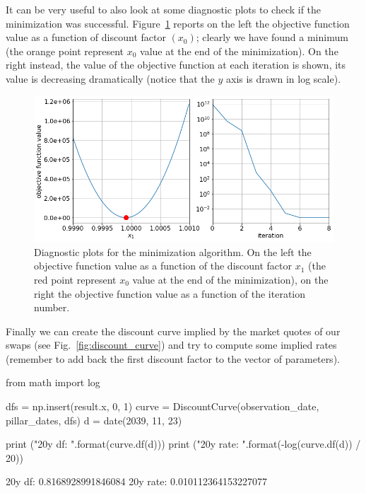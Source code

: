 It can be very useful to also look at some diagnostic plots to check if the minimization was successful. Figure~\ref{fig:minimization_diagnostic} reports on the left the objective function value as a function of discount factor $(x_0)$; clearly we have found a minimum (the orange point represent $x_0$ value at the end of the minimization). On the right instead, the value of the objective function at each iteration is shown, its value is decreasing dramatically (notice that the $y$ axis is drawn in log scale).

\begin{figure}[htb]
	\centering
	\includegraphics[width=0.9\linewidth]{figures/obj_func_diagnostic}
	\caption{Diagnostic plots for the minimization algorithm. On the left the objective function value as a function of the discount factor $x_1$ (the red point represent $x_0$ value at the end of the minimization), on the right the objective function value as a function of the iteration number.}
	\label{fig:minimization_diagnostic}
\end{figure}

Finally we can create the discount curve implied by the market quotes of our swaps (see Fig.~\ref{fig:discount_curve}) and try to compute some implied rates (remember to add back the first discount factor to the vector of parameters).

\begin{ipython}
from math import log

dfs = np.insert(result.x, 0, 1)
curve = DiscountCurve(observation_date, pillar_dates, dfs)
d = date(2039, 11, 23)

print ("20y df: {}".format(curve.df(d)))
print ("20y rate: {}".format(-log(curve.df(d)) / 20))
\end{ipython}
\begin{ioutput}
20y df: 0.8168928991846084
20y rate: 0.010112364153227077
\end{ioutput}

